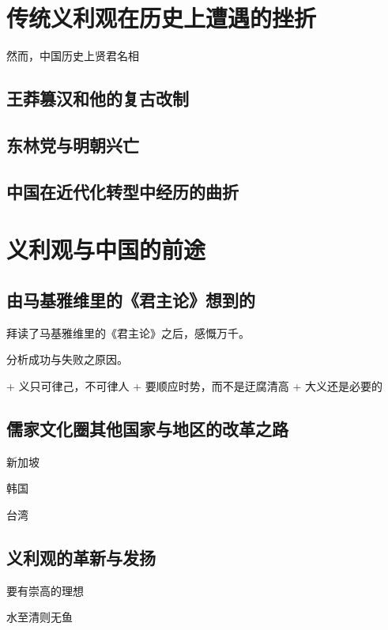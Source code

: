 \section{传统义利观在历史上遭遇的挫折}

然而，中国历史上贤君名相

\subsection{王莽篡汉和他的复古改制}

\subsection{东林党与明朝兴亡}

\subsection{中国在近代化转型中经历的曲折}

\section{义利观与中国的前途}

\subsection{由马基雅维里的《君主论》想到的}

拜读了马基雅维里的《君主论》之后，感慨万千。

分析成功与失败之原因。

+ 义只可律己，不可律人
+ 要顺应时势，而不是迂腐清高
+ 大义还是必要的

\subsection{儒家文化圈其他国家与地区的改革之路}

新加坡

韩国

台湾

\subsection{义利观的革新与发扬}

要有崇高的理想

水至清则无鱼

\printbibliography
\nocite{*}


